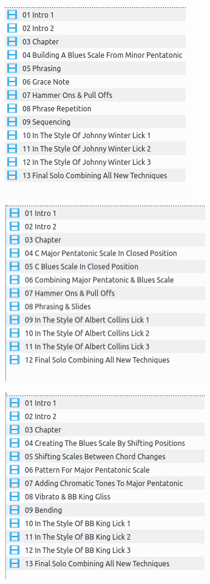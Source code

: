 \documentclass[a4paper]{book}
\begin{document}
\begin{center}
\includegraphics[width=7.883cm,height=8.2cm]{lebluessupportsmethodes-img119.png}
\end{center}





\begin{center}
\includegraphics[width=8.729cm,height=7.671cm]{lebluessupportsmethodes-img120.png}
\end{center}




\begin{center}
\includegraphics[width=8.703cm,height=8.121cm]{lebluessupportsmethodes-img121.png}
\end{center}
\end{document}
